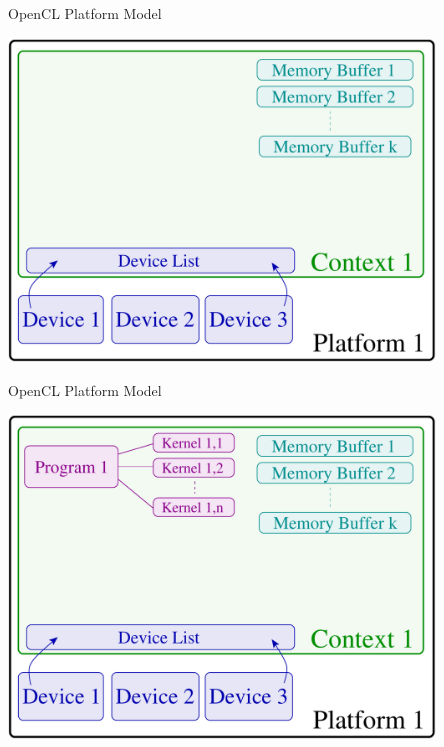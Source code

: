 \begin{frame}{OpenCL Platform Model}
 \begin{center}
   \includegraphics[width=0.85\textwidth]{figs/opencl-6.pdf}
 \end{center}
\end{frame}

\begin{frame}{OpenCL Platform Model}
 \begin{center}
   \includegraphics[width=0.85\textwidth]{figs/opencl-7.pdf}
 \end{center}
\end{frame}


